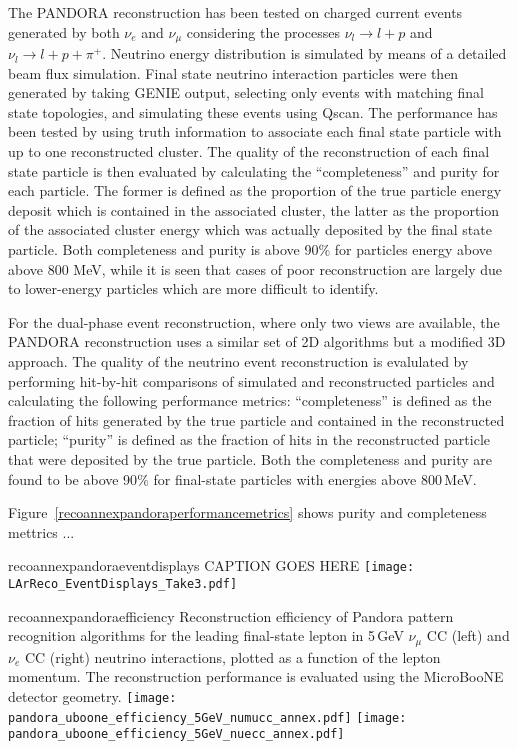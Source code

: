 The PANDORA reconstruction has been tested on charged current events generated by both   $\nu_{e}$  and $\nu_{\mu}$  
considering the processes $\nu_{l}\to l+p$  and $\nu_{l}\to l+p+\pi^{+}$.
Neutrino energy distribution is simulated by means of a detailed beam flux simulation.
Final state neutrino interaction particles were then generated by taking GENIE output, selecting only events with matching final state topologies, 
and simulating these events using Qscan.
 The performance has been tested by using truth information to associate each final state particle with up to one reconstructed cluster.
The quality of the reconstruction of each final state particle is then evaluated by calculating the ``completeness'' and purity for each particle.
The former is defined as the proportion of the true particle energy deposit which 
is contained in the associated cluster, the latter as  the proportion of the associated cluster energy which was actually deposited by the final state particle.
Both completeness and purity is above 90$\%$ for particles energy above above 800 MeV, while
it is seen that cases of poor reconstruction are largely due to lower-energy particles which are more difficult to identify.


For the dual-phase event reconstruction, where only two views are available,
the PANDORA reconstruction uses a similar set of 2D algorithms but
a modified 3D approach. The quality of the neutrino event reconstruction 
is evalulated by performing hit-by-hit comparisons of simulated and 
reconstructed particles and calculating the following performance metrics: 
``completeness'' is defined as the fraction of hits generated by 
the true particle and contained in the reconstructed particle; 
``purity'' is defined as the fraction of hits in the reconstructed 
particle that were deposited by the true particle. 
Both the completeness and purity are found to be above 90$\%$ for 
final-state particles with energies above 800\,MeV.

Figure~\ref{recoannexpandoraperformancemetrics} shows purity and completeness mettrics ...




\begin{cdrfigure}{recoannexpandoraeventdisplays}
{CAPTION GOES HERE}
\texttt{[image: LArReco\_EventDisplays\_Take3.pdf]}
\end{cdrfigure}

\begin{cdrfigure}{recoannexpandoraefficiency}
{Reconstruction efficiency of Pandora pattern recognition algorithms
 for the leading final-state lepton in 5\,GeV $\nu_{\mu}$ CC (left) and
 $\nu_{e}$ CC (right) neutrino interactions, plotted as a function of
 the lepton momentum. The reconstruction performance is evaluated
 using the MicroBooNE detector geometry. }
\texttt{[image: pandora\_uboone\_efficiency\_5GeV\_numucc\_annex.pdf]}
\texttt{[image: pandora\_uboone\_efficiency\_5GeV\_nuecc\_annex.pdf]}
\end{cdrfigure}

